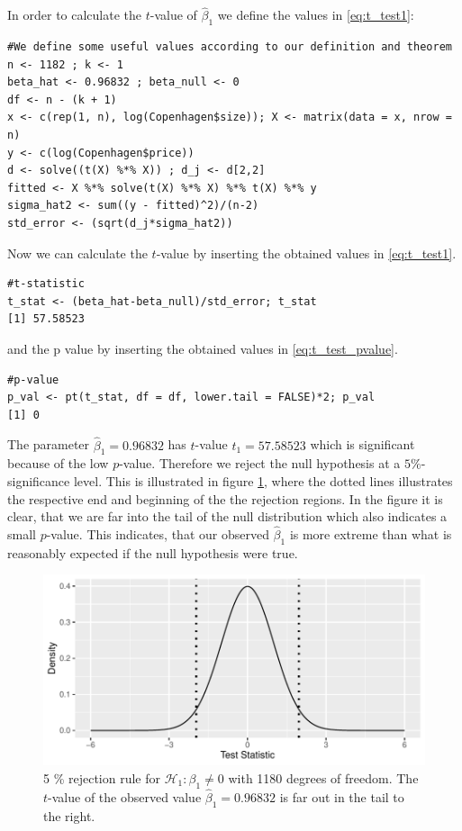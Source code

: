 In order to calculate the $t$-value of $\hat{\beta}_1$ we define the values in \eqref{eq:t_test1}:
\begin{lstlisting}
#We define some useful values according to our definition and theorem
n <- 1182 ; k <- 1
beta_hat <- 0.96832 ; beta_null <- 0
df <- n - (k + 1)
x <- c(rep(1, n), log(Copenhagen$size)); X <- matrix(data = x, nrow = n)
y <- c(log(Copenhagen$price))
d <- solve((t(X) %*% X)) ; d_j <- d[2,2]
fitted <- X %*% solve(t(X) %*% X) %*% t(X) %*% y
sigma_hat2 <- sum((y - fitted)^2)/(n-2)
std_error <- (sqrt(d_j*sigma_hat2))
\end{lstlisting}
Now we can calculate the $t$-value by inserting the obtained values in \eqref{eq:t_test1}.
\begin{lstlisting}
#t-statistic
t_stat <- (beta_hat-beta_null)/std_error; t_stat
[1] 57.58523
\end{lstlisting}
and the p value by inserting the obtained values in \eqref{eq:t_test_pvalue}.
\begin{lstlisting}
#p-value
p_val <- pt(t_stat, df = df, lower.tail = FALSE)*2; p_val
[1] 0
\end{lstlisting}
The parameter $\hat{\beta}_1=0.96832$ has $t$-value $t_1 = 57.58523$ which is significant because of the low $p$-value. 
Therefore we reject the null hypothesis at a $5\%$-significance level. 
This is illustrated in figure \ref{fig:t_distributionplot1}, where the dotted lines illustrates the respective end and beginning of the the rejection regions.
In the figure it is clear, that we are far into the tail of the null distribution which also indicates a small $p$-value. 
This indicates, that our observed $\hat{\beta}_1$ is more extreme than what is reasonably expected if the null hypothesis were true.
\begin{figure}[H]
    \centering
    \includegraphics[width = 0.75 \textwidth]{figures/Nanna/pdf.pdf}
    \caption{5 \% rejection rule for $\mathcal{H}_1:\beta_1\neq0$ with 1180 degrees of freedom. The $t$-value of the observed value $\hat{\beta}_1=0.96832$ is far out in the tail to the right.}
    \label{fig:t_distributionplot1}
\end{figure}
